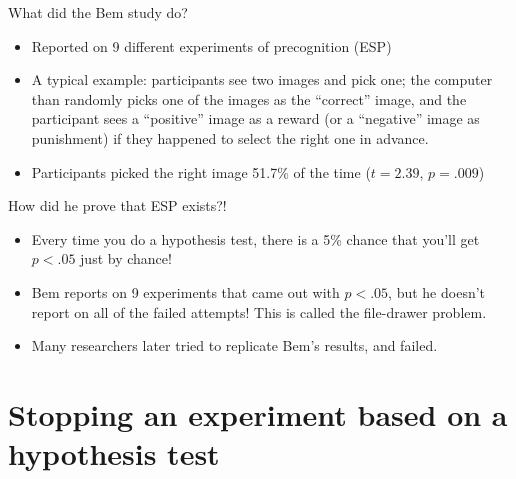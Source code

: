 \documentclass{beamer}\usepackage[]{graphicx}\usepackage[]{color}
\begin{document}
\begin{darkframes}
    \begin{frame}
    \end{frame}

    \begin{frame}
    \end{frame}

    \begin{frame}
    \end{frame}

    \begin{frame}
    \end{frame}

    \begin{frame}{What did the Bem study do?}
      \begin{itemize}[<+->]
        \item Reported on 9 different experiments of precognition (ESP)
        \item A typical example: participants see two images and pick one; the computer than randomly picks one of the images as the ``correct'' image, and the participant sees a ``positive'' image as a reward (or a ``negative'' image as punishment) if they happened to select the right one in advance.
        \item Participants picked the right image 51.7\% of the time ($t=2.39$, $p=.009$)
      \end{itemize}
    \end{frame}

    \begin{frame}{How did he prove that ESP exists?!}
      \begin{itemize}[<+->]
        \item Every time you do a hypothesis test, there is a 5\% chance that you'll get $p<.05$ just by chance!
        \item Bem reports on 9 experiments that came out with $p<.05$, but he doesn't report on all of the failed attempts! This is called the \alert{file-drawer problem}.
        \item Many researchers later tried to replicate Bem's results, and failed.
      \end{itemize}
    \end{frame}

    \section{Stopping an experiment based on a hypothesis test}


\end{darkframes}
\end{document}

